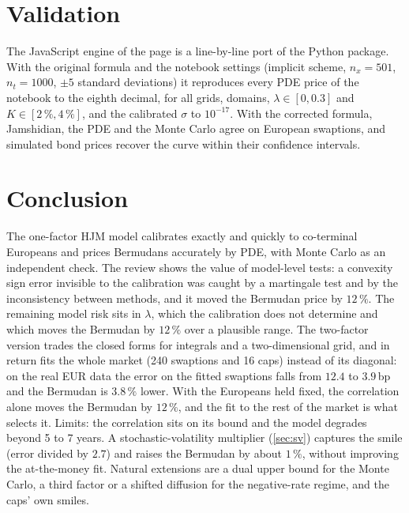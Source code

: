 \documentclass[11pt,a4paper]{article}
\theoremstyle{definition}
\theoremstyle{remark}
\begin{document}
\section{Validation}
The JavaScript engine of the page is a line-by-line port of the Python package. With the original formula and the notebook
settings (implicit scheme, $n_x=501$, $n_t=1000$, $\pm5$ standard deviations) it reproduces every PDE price of the notebook
to the eighth decimal, for all grids, domains, $\lambda\in[0,0.3]$ and $K\in[2\,\%,4\,\%]$, and the calibrated $\sigma$ to
$10^{-17}$. With the corrected formula, Jamshidian, the PDE and the Monte Carlo agree on European swaptions, and simulated bond
prices recover the curve within their confidence intervals.

\section{Conclusion}
The one-factor HJM model calibrates exactly and quickly to co-terminal Europeans and prices Bermudans accurately by PDE, with
Monte Carlo as an independent check. The review shows the value of model-level tests: a convexity sign error invisible to the
calibration was caught by a martingale test and by the inconsistency between methods, and it moved the Bermudan price by
$12\,\%$. The remaining model risk sits in $\lambda$, which the calibration does not determine and which moves the Bermudan by
$12\,\%$ over a plausible range. The two-factor version trades the closed forms for integrals and a two-dimensional grid, and in
return fits the whole market (240 swaptions and 16 caps) instead of its diagonal: on the real EUR data the error on the fitted swaptions falls from
$12.4$ to $3.9\,$bp and the Bermudan is $3.8\,\%$ lower. With the Europeans held fixed, the correlation alone moves the Bermudan by $12\,\%$, and the fit to
the rest of the market is what selects it. Limits: the correlation sits on its bound and the model degrades beyond 5 to 7 years. A stochastic-volatility multiplier (\cref{sec:sv}) captures the smile
(error divided by $2.7$) and raises the Bermudan by about $1\,\%$, without improving the at-the-money fit. Natural extensions are a dual upper bound for the Monte Carlo, a third factor or a shifted diffusion for the negative-rate regime, and the caps' own smiles.
\end{document}
